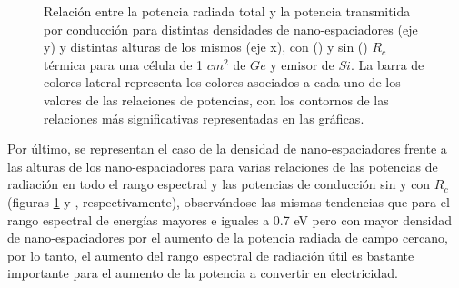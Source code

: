 \begin{figure}[H]
	\caption[Relación entre la potencia radiada total y la potencia transmitida por conducción para distintas densidades de nano-espaciadores (eje y) y distintas alturas de los mismos (eje x), con () y sin () $R_c$ térmica para una célula de 1 $cm^2$ de $Ge$ y emisor de $Si$. La barra de colores lateral representa los colores asociados a cada uno de los valores de las relaciones de potencias, con los contornos de las relaciones más significativas representadas en las gráficas.]{\small  Relación entre la potencia radiada total y la potencia transmitida por conducción para distintas densidades de nano-espaciadores (eje y) y distintas alturas de los mismos (eje x), con () y sin () $R_c$ térmica para una célula de 1 $cm^2$ de $Ge$ y emisor de $Si$. La barra de colores lateral representa los colores asociados a cada uno de los valores de las relaciones de potencias, con los contornos de las relaciones más significativas representadas en las gráficas.
	}%
	\label{fig:rels_SiSiO2Ge_full}%
\end{figure}
Por último, se representan el caso de la densidad de nano-espaciadores frente a las alturas de los nano-espaciadores para varias relaciones de las potencias de radiación en todo el rango espectral y las potencias de conducción sin y con $R_c$ (figuras \ref{fig:rels_SiSiO2Ge_full}   y , respectivamente), observándose las mismas tendencias que para el rango espectral de energías mayores e iguales a 0.7 eV pero con mayor densidad de nano-espaciadores por el aumento de la potencia radiada de campo cercano, por lo tanto, el aumento del rango espectral de radiación útil es bastante importante para el aumento de la potencia a convertir en electricidad.\\\\
